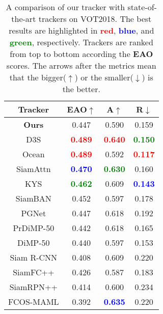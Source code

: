 \documentclass[final]{cvpr}
\begin{document}
\begin{table}[tbp]
 \centering
 \caption{\label{tab:vot2018_tab}A comparison of our tracker with state-of-the-art trackers on VOT2018. The best results are highlighted in \textcolor{red}{\textbf{red}}, \textcolor{blue}{\textbf{blue}}, and \textcolor{green}{\textbf{green}}, respectively. Trackers are ranked from top to bottom according the \textbf{EAO} scores. The arrows after the metrics mean that the bigger($\uparrow$) or the smaller($\downarrow$) is the better.}
 \vspace{-1.0em}
 \begin{tabular}{cccc}
  \toprule
  \textbf{Tracker} & \textbf{EAO$\uparrow$} & \textbf{A$\uparrow$} & \textbf{R$\downarrow$} \\
  \midrule
  \textbf{Ours} & 0.447 & 0.590 & 0.159 \\
  D3S \cite{lukezic2020d3s} & \textcolor{red}{\textbf{0.489}} & \textcolor{red}{\textbf{0.640}} & \textcolor{green}{\textbf{0.150}} \\
  Ocean \cite{zhang2020ocean} & \textcolor{red}{\textbf{0.489}} & 0.592 & \textcolor{red}{\textbf{0.117}} \\
  SiamAttn \cite{yu2020deformable} & \textcolor{blue}{\textbf{0.470}} & \textcolor{green}{\textbf{0.630}} & 0.160 \\
  KYS \cite{bhat2020know} & \textcolor{green}{\textbf{0.462}} & 0.609 & \textcolor{blue}{\textbf{0.143}} \\
  SiamBAN \cite{chen2020siamese} & 0.452 & 0.597 & 0.178 \\
  PGNet \cite{liaopg} & 0.447 & 0.618 & 0.192 \\
  PrDiMP-50 \cite{danelljan2020probabilistic} & 0.442 & 0.618 & 0.165 \\
  DiMP-50 \cite{bhat2019learning} & 0.440 & 0.597 & 0.153 \\
  Siam R-CNN \cite{voigtlaender2020siam} & 0.408 & 0.609 & 0.220 \\
  SiamFC++ \cite{xu2020siamfc++} & 0.426 & 0.587 & 0.183 \\
  SiamRPN++ \cite{li2019siamrpn++} & 0.414 & 0.600 & 0.234 \\
  FCOS-MAML \cite{wang2020tracking} & 0.392 & \textcolor{blue}{\textbf{0.635}} & 0.220 \\
  \bottomrule
 \end{tabular}
 \vspace{-1.0em}
\end{table}
\end{document}
